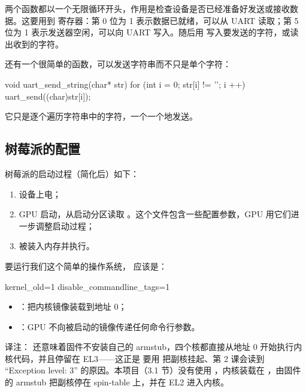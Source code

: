 两个函数都以一个无限循环开头，作用是检查设备是否已经准备好发送或接收数据。这要用到  寄存器：第 0 位为 1 表示数据已就绪，可以从 UART 读取；第 5 位为 1 表示发送器空闲，可以向 UART 写入。随后用  写入要发送的字符，或读出收到的字符。

还有一个很简单的函数，可以发送字符串而不只是单个字符：

\begin{ccode}
void uart_send_string(char* str)
{
	for (int i = 0; str[i] != '\0'; i ++) {
		uart_send((char)str[i]);
	}
}
\end{ccode}

它只是逐个遍历字符串中的字符，一个一个地发送。

\subsection{树莓派的配置}

树莓派的启动过程（简化后）如下：

\begin{enumerate}
  \item 设备上电；
  \item GPU 启动，从启动分区读取 。这个文件包含一些配置参数，GPU 用它们进一步调整启动过程；
  \item {} 被装入内存并执行。
\end{enumerate}

要运行我们这个简单的操作系统， 应该是：

\begin{txtcode}
kernel_old=1
disable_commandline_tags=1
\end{txtcode}

\begin{itemize}
  \item {}：把内核镜像装载到地址 0；
  \item {}：GPU 不向被启动的镜像传递任何命令行参数。
\end{itemize}

\begin{remark}
  译注： 还意味着固件不安装自己的 armstub，四个核都直接从地址 0 开始执行内核代码，并且停留在 EL3——这正是  要用  把副核挂起、第 2 课会读到 “Exception level: 3” 的原因。本项目（3.1 节）没有使用 ，内核装载在 ，由固件的 armstub 把副核停在 spin-table 上，并在 EL2 进入内核。
\end{remark}

